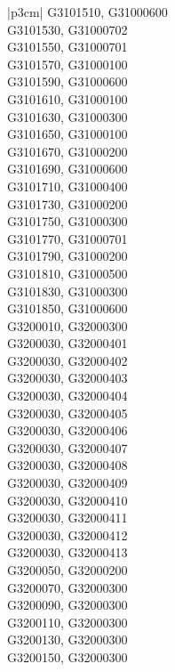 \begin{customLongTable}{ |p{3cm}| }
G3101510, G31000600 \\ \hline
G3101530, G31000702 \\ \hline
G3101550, G31000701 \\ \hline
G3101570, G31000100 \\ \hline
G3101590, G31000600 \\ \hline
G3101610, G31000100 \\ \hline
G3101630, G31000300 \\ \hline
G3101650, G31000100 \\ \hline
G3101670, G31000200 \\ \hline
G3101690, G31000600 \\ \hline
G3101710, G31000400 \\ \hline
G3101730, G31000200 \\ \hline
G3101750, G31000300 \\ \hline
G3101770, G31000701 \\ \hline
G3101790, G31000200 \\ \hline
G3101810, G31000500 \\ \hline
G3101830, G31000300 \\ \hline
G3101850, G31000600 \\ \hline
G3200010, G32000300 \\ \hline
G3200030, G32000401 \\ \hline
G3200030, G32000402 \\ \hline
G3200030, G32000403 \\ \hline
G3200030, G32000404 \\ \hline
G3200030, G32000405 \\ \hline
G3200030, G32000406 \\ \hline
G3200030, G32000407 \\ \hline
G3200030, G32000408 \\ \hline
G3200030, G32000409 \\ \hline
G3200030, G32000410 \\ \hline
G3200030, G32000411 \\ \hline
G3200030, G32000412 \\ \hline
G3200030, G32000413 \\ \hline
G3200050, G32000200 \\ \hline
G3200070, G32000300 \\ \hline
G3200090, G32000300 \\ \hline
G3200110, G32000300 \\ \hline
G3200130, G32000300 \\ \hline
G3200150, G32000300 \\ \hline

\end{customLongTable}
